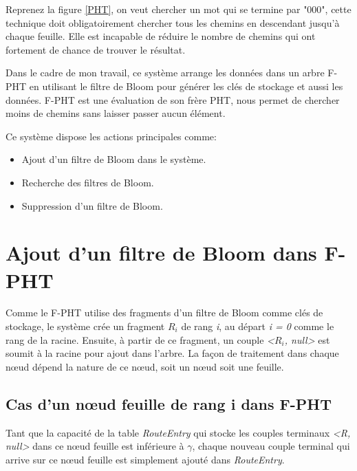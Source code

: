 \documentclass[a4paper,11pt]{report}
\begin{document}
	Reprenez la figure \ref{PHT}, on veut chercher un mot qui se termine par "000", cette technique doit obligatoirement chercher tous les chemins en descendant jusqu'à chaque feuille. Elle est incapable de réduire le nombre de chemins qui ont fortement de chance de trouver le résultat. 
	
	Dans le cadre de mon travail, ce système arrange les données dans un arbre F-PHT en utilisant le filtre de Bloom pour générer les clés de stockage et aussi les données. F-PHT est une évaluation de son frère PHT, nous permet de chercher moins de chemins sans laisser passer aucun élément.
	
	Ce système dispose les actions principales comme:
	\begin{itemize}
		\item Ajout d'un filtre de Bloom dans le système.
		\item Recherche des filtres de Bloom.
		\item Suppression d'un filtre de Bloom.
	\end{itemize}
	
\section{Ajout d'un filtre de Bloom dans F-PHT}
	Comme le F-PHT utilise des fragments d'un filtre de Bloom comme clés de stockage, le système crée un fragment \textit{$R_i$} de rang \textit{i}, au départ \textit{i = 0} comme le rang de la racine. Ensuite, à partir de ce fragment, un couple \textit{<$R_i$, null>} est soumit à la racine pour ajout dans l'arbre. La façon de traitement dans chaque nœud dépend la nature de ce nœud, soit un nœud soit une feuille.

\subsection{Cas d'un nœud feuille de rang i dans F-PHT}
	Tant que la capacité de la table \textit{RouteEntry} qui stocke les couples terminaux \textit{<R, null>} dans ce nœud feuille est inférieure à $\gamma$, chaque nouveau couple terminal qui arrive sur ce nœud feuille est simplement ajouté dans \textit{RouteEntry}.
\end{document}
